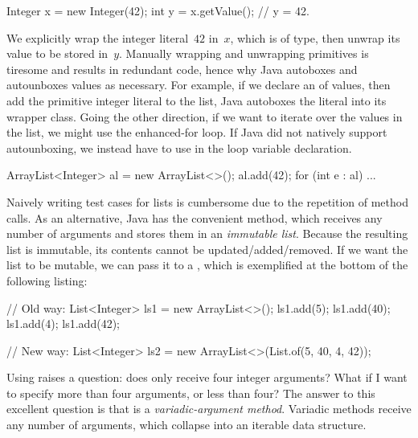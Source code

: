 \begin{verbnobox}[\small]
Integer x = new Integer(42);
int y = x.getValue(); // y = 42.
\end{verbnobox}

We explicitly wrap the integer literal~$42$ in~$x$, which is of  type, then unwrap its value to be stored in~$y$. 
Manually wrapping and unwrapping primitives is tiresome and results in redundant code, hence why Java autoboxes and autounboxes values as necessary. 
For example, if we declare an  of  values, then add the primitive integer literal  to the list, Java autoboxes the literal into its  wrapper class. 
Going the other direction, if we want to iterate over the values in the list, we might use the enhanced-for loop. 
If Java did not natively support autounboxing, we instead have to use  in the loop variable declaration. 

\begin{verbnobox}[\small]
ArrayList<Integer> al = new ArrayList<>();
al.add(42);
for (int e : al) {
  ...
}
\end{verbnobox}

Naively writing test cases for lists is cumbersome due to the repetition of  method calls. 
As an alternative, Java has the convenient  method, which receives any number of arguments and stores them in an \emph{immutable list}.
Because the resulting list is immutable, its contents cannot be updated/added/removed. 
If we want the list to be mutable, we can pass it to a , which is exemplified at the bottom of the following listing:

\begin{verbnobox}[\small]
// Old way:
List<Integer> ls1 = new ArrayList<>();
ls1.add(5);
ls1.add(40);
ls1.add(4);
ls1.add(42);

// New way:
List<Integer> ls2 = new ArrayList<>(List.of(5, 40, 4, 42));
\end{verbnobox}

Using  raises a question: does  only receive four integer arguments? 
What if I want to specify more than four arguments, or less than four? 
The answer to this excellent question is that  is a \emph{variadic-argument method}. 
Variadic methods receive any number of arguments, which collapse into an iterable data structure.

